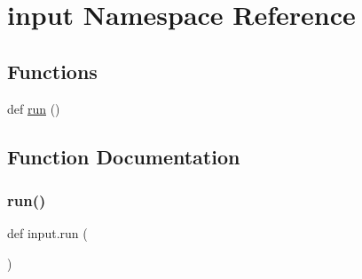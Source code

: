 \hypertarget{namespaceinput}{}\section{input Namespace Reference}
\label{namespaceinput}
\subsection*{Functions}
\begin{DoxyCompactItemize}
\item 
def \hyperlink{namespaceinput_acf8fe4c0bb6a777022f311c22f311770}{run} ()
\end{DoxyCompactItemize}


\subsection{Function Documentation}
\mbox{\label{namespaceinput_acf8fe4c0bb6a777022f311c22f311770}} 
\subsubsection{\texorpdfstring{run()}{run()}}
{\footnotesize\ttfamily def input.\+run (\begin{DoxyParamCaption}{ }\end{DoxyParamCaption})}

